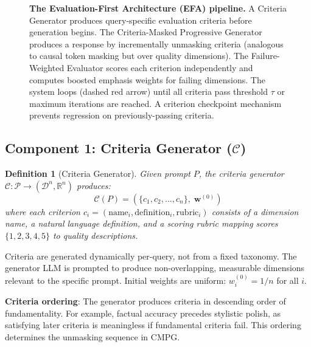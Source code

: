 \documentclass[11pt]{article}
\newtheorem{definition}{Definition}
\newcommand{\efa}{\textsc{EFA}}  %
\newcommand{\cmpg}{\textsc{CMPG}}
\newcommand{\R}{\mathbb{R}}
\newcommand{\calC}{\mathcal{C}}
\newcommand{\calD}{\mathcal{D}} %
\begin{document}
\begin{figure}[t]
\caption{\textbf{The Evaluation-First Architecture (\efa{}) pipeline.} A Criteria Generator produces query-specific evaluation criteria before generation begins. The Criteria-Masked Progressive Generator produces a response by incrementally unmasking criteria (analogous to causal token masking but over quality dimensions). The Failure-Weighted Evaluator scores each criterion independently and computes boosted emphasis weights for failing dimensions. The system loops (dashed red arrow) until all criteria pass threshold $\tau$ or maximum iterations are reached. A criterion checkpoint mechanism prevents regression on previously-passing criteria.}
\label{fig:pipeline}
\end{figure}

\subsection{Component 1: Criteria Generator ($\calC$)}

\begin{definition}[Criteria Generator]
Given prompt $P$, the criteria generator $\calC: \mathcal{P} \rightarrow (\calD^n, \R^n)$ produces:
\begin{equation}
    \calC(P) = \left( \{c_1, c_2, \ldots, c_n\}, \; \mathbf{w}^{(0)} \right)
\end{equation}
where each criterion $c_i = (\text{name}_i, \text{definition}_i, \text{rubric}_i)$ consists of a dimension name, a natural language definition, and a scoring rubric mapping scores $\{1, 2, 3, 4, 5\}$ to quality descriptions.
\end{definition}

Criteria are generated dynamically per-query, not from a fixed taxonomy. The generator LLM is prompted to produce non-overlapping, measurable dimensions relevant to the specific prompt. Initial weights are uniform: $w_i^{(0)} = 1/n$ for all $i$.

\textbf{Criteria ordering}: The generator produces criteria in descending order of fundamentality. For example, factual accuracy precedes stylistic polish, as satisfying later criteria is meaningless if fundamental criteria fail. This ordering determines the unmasking sequence in \cmpg{}.
\end{document}
